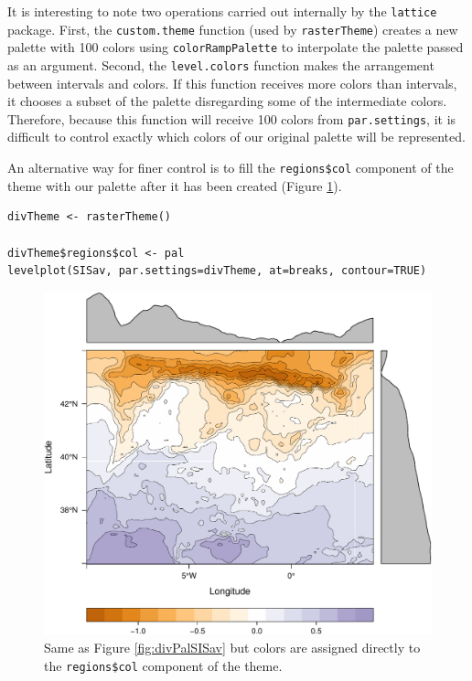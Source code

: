 It is interesting to note two operations carried out internally by
the \texttt{lattice} package. First, the \texttt{custom.theme} function (used by
\texttt{rasterTheme}) creates a new palette with 100 colors using
\texttt{colorRampPalette} to interpolate the palette passed as an
argument. Second, the \texttt{level.colors} function makes the
arrangement between intervals and colors. If this function
receives more colors than intervals, it chooses a subset of the
palette disregarding some of the intermediate colors. Therefore,
because this function will receive 100 colors from \texttt{par.settings}, it
is difficult to control exactly which colors of our original
palette will be represented.

An alternative way for finer control is to fill the \texttt{regions\$col}
component of the theme with our palette after it has been created
(Figure \ref{fig:divPal_SISav_regions}).

\lstset{language=R,numbers=none}
\begin{lstlisting}
divTheme <- rasterTheme()

divTheme$regions$col <- pal
levelplot(SISav, par.settings=divTheme, at=breaks, contour=TRUE)
\end{lstlisting}

\begin{figure}[htb]
\centering
\includegraphics[width=.9\linewidth]{figs/divPalSISav_regions.pdf}
\caption{\label{fig:divPal_SISav_regions}Same as Figure \ref{fig:divPalSISav} but colors are assigned directly to the \texttt{regions\$col} component of the theme.}
\end{figure}

